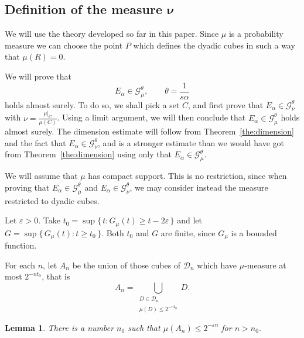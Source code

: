 \documentclass[11pt]{article}
\newtheorem{lemm}[theo]{Lemma}
\theoremstyle{definition}
\numberwithin{equation}{section}
\numberwithin{figure}{section}
\numberwithin{table}{section}
\begin{document}
\subsection{Definition of the measure \texorpdfstring{$\boldsymbol{\nu}$}{}}

We will use the theory developed so far in this paper. Since $\mu$ is a probability measure we can choose the point $P$ which defines the dyadic cubes in such a way that $\mu (R) = 0$.

We will prove that
\begin{equation*}
E_\alpha \in \mathscr{G}_\mu^\theta, \qquad \theta = \frac{1}{s
\alpha}
\end{equation*}
holds almost surely. To do so, we shall pick a set $C$, and first prove that $E_\alpha \in \mathscr{G}_\nu^\theta$ with $\nu =
\frac{\mu|_C}{\mu (C)}$. Using a limit argument, we will then conclude that $E_\alpha \in \mathscr{G}_\mu^\theta$ holds almost surely. The dimension estimate will follow from Theorem~\ref{the:dimension} and the fact that $E_\alpha \in \mathscr{G}_\nu^\theta$, and is a stronger estimate than we would have got from Theorem~\ref{the:dimension} using only that $E_\alpha \in \mathscr{G}_\mu^\theta$.

We will assume that $\mu$ has compact support. This is no restriction, since when proving that $E_\alpha \in \mathscr{G}_\mu^\theta$ and $E_\alpha \in \mathscr{G}_\nu^\theta$, we may consider instead the measure restricted to dyadic cubes.

Let $\varepsilon > 0$. Take $t_0 = \sup \{\, t : G_\mu (t) \geq t - 2
\varepsilon \,\}$ and let $G = \sup \{\, G_\mu (t) : t \geq t_0
\,\}$. Both $t_0$ and $G$ are finite, since $G_\mu$ is a bounded function.

For each $n$, let $A_n$ be the union of those cubes of $\mathscr{D}_n$ which have $\mu$-measure at most $2^{- n t_0}$, that is
\[
A_n = \bigcup_{\substack{D \in \mathscr{D}_n \\ \mu (D) \leq 2^{-n t_0}}} D.
\]

\begin{lemm}\label{lem:t0}
There is a number $n_0$ such that $\mu (A_n) \leq 2^{- \varepsilon n}$ for $n > n_0$.
\end{lemm}
\end{document}
